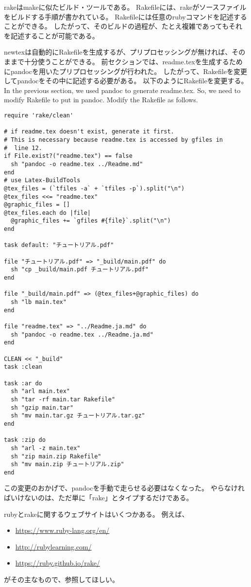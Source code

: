 rakeはmakeに似たビルド・ツールである。
Rakefileには、rakeがソースファイルをビルドする手順が書かれている。
Rakefileには任意のrubyコマンドを記述することができる。
したがって、そのビルドの過程が、たとえ複雑であってもそれを記述することが可能である。

newtexは自動的にRakefileを生成するが、プリプロセッシングが無ければ、そのままで十分使うことができる。
前セクションでは、readme.texを生成するためにpandocを用いたプリプロセッシングが行われた。
したがって、Rakefileを変更してpandocをその中に記述する必要がある。
以下のようにRakefileを変更する。
In the previous section, we used pandoc to generate readme.tex.
So, we need to modify Rakefile to put in pandoc.
Modify the Rakefile as follows.
\begin{verbatim}
require 'rake/clean'

# if readme.tex doesn't exist, generate it first.
# This is necessary because readme.tex is accessed by gfiles in
#  line 12.
if File.exist?("readme.tex") == false
  sh "pandoc -o readme.tex ../Readme.md"
end
# use Latex-BuildTools
@tex_files = (`tfiles -a` + `tfiles -p`).split("\n")
@tex_files <<= "readme.tex"
@graphic_files = []
@tex_files.each do |file|
  @graphic_files += `gfiles #{file}`.split("\n")
end

task default: "チュートリアル.pdf"

file "チュートリアル.pdf" => "_build/main.pdf" do
  sh "cp _build/main.pdf チュートリアル.pdf"
end

file "_build/main.pdf" => (@tex_files+@graphic_files) do
  sh "lb main.tex"
end

file "readme.tex" => "../Readme.ja.md" do
  sh "pandoc -o readme.tex ../Readme.ja.md"
end

CLEAN << "_build"
task :clean

task :ar do
  sh "arl main.tex"
  sh "tar -rf main.tar Rakefile"
  sh "gzip main.tar"
  sh "mv main.tar.gz チュートリアル.tar.gz"
end

task :zip do
  sh "arl -z main.tex"
  sh "zip main.zip Rakefile"
  sh "mv main.zip チュートリアル.zip"
end\end{verbatim}

この変更のおかげで、pandocを手動で走らせる必要はなくなった。
やらなければいけないのは、ただ単に「rake」とタイプするだけである。

rubyとrakeに関するウェブサイトはいくつかある。
例えば、
\begin{itemize}
\item \url{https://www.ruby-lang.org/en/}
\item \url{http://rubylearning.com/}
\item \url{https://ruby.github.io/rake/}
\end{itemize}
がその主なもので、参照してほしい。
